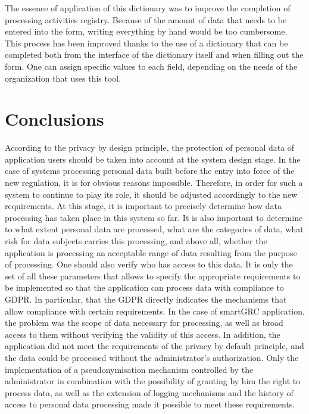 \documentclass[en, noamssymb]{mgr}
\begin{document}
The essence of application of this dictionary was to improve the completion of processing activities registry. Because of the amount of data that needs to be entered into the form, writing everything by hand would be too cumbersome. This process has been improved thanks to the use of a dictionary that can be completed both from the interface of the dictionary itself and when filling out the form. One can assign specific values to each field, depending on the needs of the organization that uses this tool.

\chapter{Conclusions} \label{sec:sekcjaWnioski}

According to the privacy by design principle, the protection of personal data of application users should be taken into account at the system design stage. In the case of systems processing personal data built before the entry into force of the new regulation, it is for obvious reasons impossible. Therefore, in order for such a system to continue to play its role, it should be adjusted accordingly to the new requirements. At this stage, it is important to precisely determine how data processing has taken place in this system so far. It is also important to determine to what extent personal data are processed, what are the categories of data, what risk for data subjects carries this processing, and above all, whether the application is processing an acceptable range of data resulting from the purpose of processing. One should also verify who has access to this data. It is only the set of all these parameters that allows to specify the appropriate requirements to be implemented so that the application can process data with compliance to GDPR. In particular, that the GDPR directly indicates the mechanisms that allow compliance with certain requirements. In the case of smartGRC application, the problem was the scope of data necessary for processing, as well as broad access to them without verifying the validity of this access. In addition, the application did not meet the requirements of the privacy by default principle, and the data could be processed without the administrator's authorization. Only the implementation of a pseudonymisation mechanism controlled by the administrator in combination with the possibility of granting by him the right to process data, as well as the extension of logging mechanisms and the history of access to personal data processing made it possible to meet these requirements.\\
\end{document}
